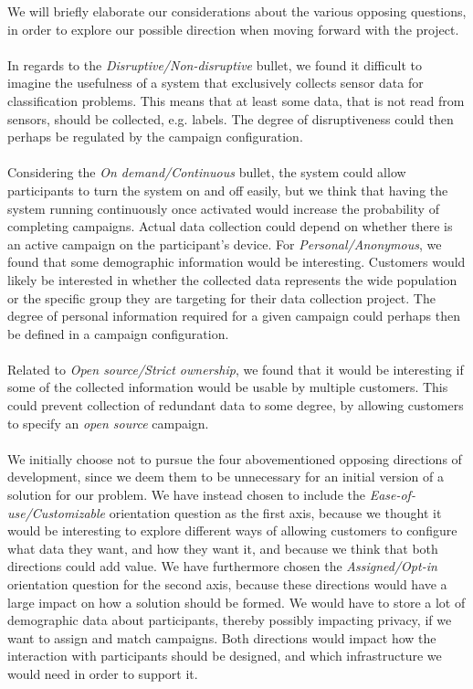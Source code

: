 We will briefly elaborate our considerations about the various opposing questions, in order to explore our possible direction when moving forward with the project. 
\\\\
In regards to the \emph{Disruptive/Non-disruptive} bullet, we found it difficult to imagine the usefulness of a system that exclusively collects sensor data for classification problems. This means that at least some data, that is not read from sensors, should be collected, e.g. labels. The degree of disruptiveness could then perhaps be regulated by the campaign configuration. 
\\\\
Considering the \emph{On demand/Continuous} bullet, the system could allow participants to turn the system on and off easily, but we think that having the system running continuously once activated would increase the probability of completing campaigns. Actual data collection could depend on whether there is an active campaign on the participant's device. 
\newpage
For \emph{Personal/Anonymous}, we found that some demographic information would be interesting. Customers would likely be interested in whether the collected data represents the wide population or the specific group they are targeting for their data collection project. The degree of personal information required for a given campaign could perhaps then be defined in a campaign configuration. 
\\\\
Related to \emph{Open source/Strict ownership}, we found that it would be interesting if some of the collected information would be usable by multiple customers. This could prevent collection of redundant data to some degree, by allowing customers to specify an \emph{open source} campaign.
\\\\
We initially choose not to pursue the four abovementioned opposing directions of development, since we deem them to be unnecessary for an initial version of a solution for our problem. 
We have instead chosen to include the \emph{Ease-of-use/Customizable} orientation question as the first axis, because we thought it would be interesting to explore different ways of allowing customers to configure what data they want, and how they want it, and because we think that both directions could add value. 
We have furthermore chosen the \emph{Assigned/Opt-in} orientation question for the second axis, because these directions would have a large impact on how a solution should be formed. We would have to store a lot of demographic data about participants, thereby possibly impacting privacy, if we want to assign and match campaigns. Both directions would impact how the interaction with participants should be designed, and which infrastructure we would need in order to support it.
